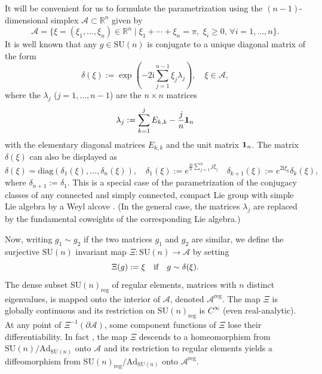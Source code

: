 \documentclass[a4paper,11pt,reqno]{amsart}
\theoremstyle{definition}
\numberwithin{equation}{section}
\newcommand{\be}{\begin{equation}}
\newcommand{\ee}{\end{equation}}
\def\cA{{\mathcal A}}                       %
\def\reg{\mathrm{reg}}                      %
\def\ri{{\mathrm{i}}}                       %
\def\1{{\mbox{\boldmath $1$}}}              %
\def\bR{{\mathbb R}}                        %
\def\diag{\mathrm{diag}}                    %
\def\SU{\mathrm{SU}}                        %
\def\Ad{\mathrm{Ad}}                        %
\def\reg{\mathrm{reg}}                      %
\begin{document}
It will be convenient for us to formulate the parametrization using the  $(n-1)$-dimensional  simplex $\cA \subset \bR^n$ given by
\be
\cA = \{ \xi = (\xi_1, \dots, \xi_n) \in \bR^n  \mid  \xi_1+\cdots + \xi_n = \pi,\,\, \xi_i\geq 0,\,\forall i=1,\dots, n\}.
\label{T8}\ee
It is well known that  any $g\in \SU(n)$ is conjugate to a unique diagonal matrix of the form
\be
\delta(\xi):= \exp\left(-2 \ri \sum_{j=1}^{n-1} \xi_j \lambda_j\right),  \quad \xi\in \cA,
\label{T9}\ee
where the $\lambda_j$ ($j=1,\dots, n-1$) are the $n\times n$ matrices
\be
\lambda_j:= \sum_{k=1}^{j} E_{k,k} - \frac{j}{n} \1_n
\label{T10}\ee
with the elementary diagonal matrices $E_{k,k}$ and the unit matrix $\1_n$.
The matrix $\delta(\xi)$ can also be  displayed as
\be
\delta(\xi) = \diag(\delta_1(\xi), \ldots, \delta_n(\xi)),
\quad
\delta_1(\xi):=e^{\frac{2\ri}{n}\sum_{j=1}^n j\xi_j}
\quad
\delta_{k+1}(\xi):= e^{2\ri \xi_k} \delta_k(\xi),
\label{T11}\ee
where $\delta_{n+1} := \delta_1$.
This is a special case of
the parametrization of the conjugacy classes of any connected and simply connected, compact  Lie group with simple Lie algebra by a Weyl alcove \cite{DK}.
(In the general case, the matrices $\lambda_j$ are replaced by the fundamental coweights of the corresponding Lie algebra.)

Now, writing $g_1 \sim g_2$ if the two matrices $g_1$ and $g_2$ are similar,
we define the surjective $\SU(n)$ invariant map $\Xi: \SU(n) \to \cA$ by setting
\be
\Xi(g) := \xi \quad \hbox{if} \quad g \sim \delta(\xi).
\label{T12}\ee
The dense subset $\SU(n)_\reg$ of regular elements, matrices with $n$ distinct eigenvalues, is mapped onto the
interior of $\cA$, denoted  $\cA^\reg$.
The map $\Xi$ is globally continuous and its restriction on
$\SU(n)_\reg$ is $C^\infty$ (even real-analytic).  At any point of $\Xi^{-1}(\partial \cA)$, some component functions
of $\Xi$ lose their differentiability.
In fact \cite{DK}, the map $\Xi$ descends to a homeomorphism from $\SU(n)/\Ad_{\SU(n)}$ onto $\cA$
and its restriction to regular elements  yields a diffeomorphism from $\SU(n)_\reg/ \Ad_{\SU(n)}$ onto $\cA^\reg$.
\end{document}
